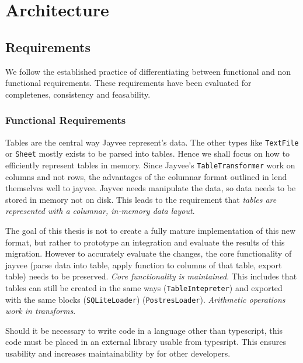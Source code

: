 \chapter{Architecture}
\label{chapter:Architecture}

\section{Requirements}
\label{section:Requirements}

We follow the established practice of differentiating between functional and non functional requirements.
These requirements have been evaluated for completenes, consistency and feasability.

\subsection{Functional Requirements}
\label{subsection:FunctionalRequirements}

Tables are the central way Jayvee represent's data.
The other types like \Verb|TextFile| or \Verb|Sheet| mostly exists to be parsed into tables.
Hence %
we shall focus on how to efficiently represent tables in memory.
Since Jayvee's \Verb|TableTransformer| work on columns and not rows, the advantages of the columnar format outlined in %
lend themselves well to jayvee.
Jayvee needs manipulate the data, so data needs to be stored in memory not on disk.
This leads to the requirement that \emph{tables are represented with a columnar, in-memory data layout}.

The goal of this thesis is not to create a fully mature implementation of this new format, but rather to prototype an integration and evaluate the results of this migration.
However to accurately evaluate the changes, the core functionality of jayvee (parse data into table, apply function to columns of that table, export table) needs to be preserved.
\emph{Core functionality is maintained}.
This includes that tables can still be created in the same ways (\Verb|TableIntepreter|) and exported with the same blocks (\Verb|SQLiteLoader|) (\Verb|PostresLoader|).
\emph{Arithmetic operations work in transforms}.

Should it be necessary to write code in a language other than typescript, this code must be placed in an external library usable from typesript.
This ensures usability and increases maintainability by for other developers.

